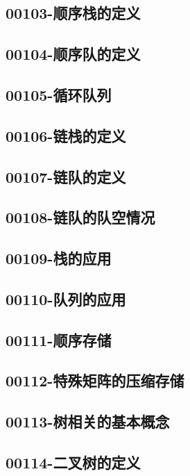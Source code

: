\subsection{00103-顺序栈的定义}

\subsection{00104-顺序队的定义}

\subsection{00105-循环队列}

\subsection{00106-链栈的定义}

\subsection{00107-链队的定义}

\subsection{00108-链队的队空情况}

\subsection{00109-栈的应用}

\subsection{00110-队列的应用}

\subsection{00111-顺序存储}

\subsection{00112-特殊矩阵的压缩存储}

\subsection{00113-树相关的基本概念}

\subsection{00114-二叉树的定义}

